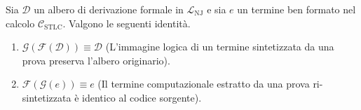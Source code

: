 \begin{thm}
    Sia $\mathcal{D}$ un albero di derivazione formale in $\mathcal{L}_{\text{NJ}}$ e sia $e$ 
    un termine ben formato nel calcolo $\mathcal{C}_{\text{STLC}}$. Valgono le seguenti identità.
    \begin{enumerate}
        \item $\mathcal{G}(\mathcal{F}(\mathcal{D})) \equiv \mathcal{D}$ (L'immagine logica di un termine sintetizzata da una prova preserva l'albero originario).
        \item $\mathcal{F}(\mathcal{G}(e))           \equiv e$           (Il termine computazionale estratto da una prova ri-sintetizzata è identico al codice sorgente).
    \end{enumerate}
\end{thm}
